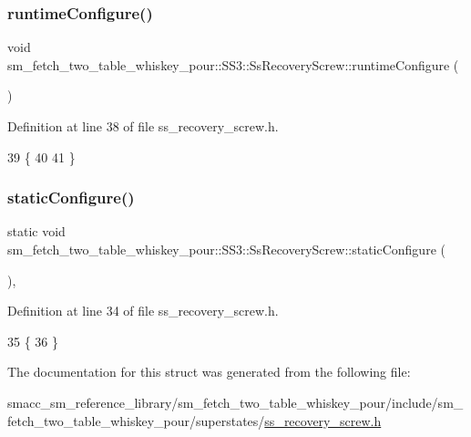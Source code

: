 \subsubsection{\texorpdfstring{runtime\+Configure()}{runtimeConfigure()}}
{\footnotesize\ttfamily void sm\+\_\+fetch\+\_\+two\+\_\+table\+\_\+whiskey\+\_\+pour\+::\+S\+S3\+::\+Ss\+Recovery\+Screw\+::runtime\+Configure (\begin{DoxyParamCaption}{ }\end{DoxyParamCaption})\hspace{0.3cm}{\ttfamily [inline]}}



Definition at line 38 of file ss\+\_\+recovery\+\_\+screw.\+h.


\begin{DoxyCode}
39             \{
40                 
41             \}
\end{DoxyCode}
\mbox{\label{structsm__fetch__two__table__whiskey__pour_1_1SS3_1_1SsRecoveryScrew_a6bfc035c0ca394ff32d4e243a5bbb5c8}} 
\subsubsection{\texorpdfstring{static\+Configure()}{staticConfigure()}}
{\footnotesize\ttfamily static void sm\+\_\+fetch\+\_\+two\+\_\+table\+\_\+whiskey\+\_\+pour\+::\+S\+S3\+::\+Ss\+Recovery\+Screw\+::static\+Configure (\begin{DoxyParamCaption}{ }\end{DoxyParamCaption})\hspace{0.3cm}{\ttfamily [inline]}, {\ttfamily [static]}}



Definition at line 34 of file ss\+\_\+recovery\+\_\+screw.\+h.


\begin{DoxyCode}
35             \{
36             \}
\end{DoxyCode}


The documentation for this struct was generated from the following file\+:\begin{DoxyCompactItemize}
\item 
smacc\+\_\+sm\+\_\+reference\+\_\+library/sm\+\_\+fetch\+\_\+two\+\_\+table\+\_\+whiskey\+\_\+pour/include/sm\+\_\+fetch\+\_\+two\+\_\+table\+\_\+whiskey\+\_\+pour/superstates/\hyperlink{sm__fetch__two__table__whiskey__pour_2include_2sm__fetch__two__table__whiskey__pour_2superstates_2ss__recovery__screw_8h}{ss\+\_\+recovery\+\_\+screw.\+h}\end{DoxyCompactItemize}
